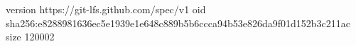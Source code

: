 version https://git-lfs.github.com/spec/v1
oid sha256:e8288981636ec5e1939e1e648c889b5b6ccca94b53e826da9f01d152b3c211ac
size 120002
